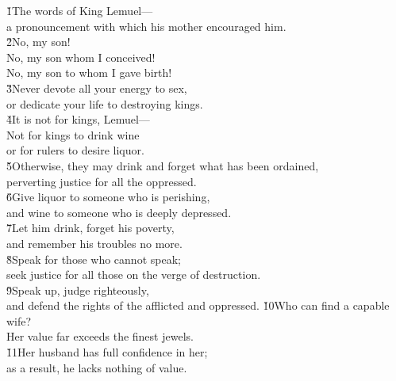 
\begin{poetry}
\poeml {}
\v{1}The words of King Lemuel--- \\
\poeml a pronouncement with which his mother encouraged him. \\
\poeml \v{2}No, my son! \\
\poemll    No, my son whom I conceived! \\
\poemlll       No, my son to whom I gave birth! \\
\poeml \v{3}Never devote all your energy to sex, \\
\poemll    or dedicate your life to destroying kings. \\
\poeml \v{4}It is not for kings, Lemuel--- \\
\poemll    Not for kings to drink wine \\
\poemlll       or for rulers to desire liquor. \\
\poeml \v{5}Otherwise, they may drink and forget what has been ordained, \\
\poemll    perverting justice for all the oppressed. \\
\poeml \v{6}Give liquor to someone who is perishing, \\
\poemll    and wine to someone who is deeply depressed. \\
\poeml \v{7}Let him drink, forget his poverty, \\
\poemll    and remember his troubles no more. \\
\poeml \v{8}Speak for those who cannot speak; \\
\poemll    seek justice for all those on the verge of destruction. \\
\poeml \v{9}Speak up, judge righteously, \\
\poemll    and defend the rights of the afflicted and oppressed.
\poeml \v{10}Who can find a capable wife? \\
\poemll    Her value far exceeds the finest jewels. \\
\poeml \v{11}Her husband has full confidence in her; \\
\poemll    as a result, he lacks nothing of value. \\

\end{poetry}
